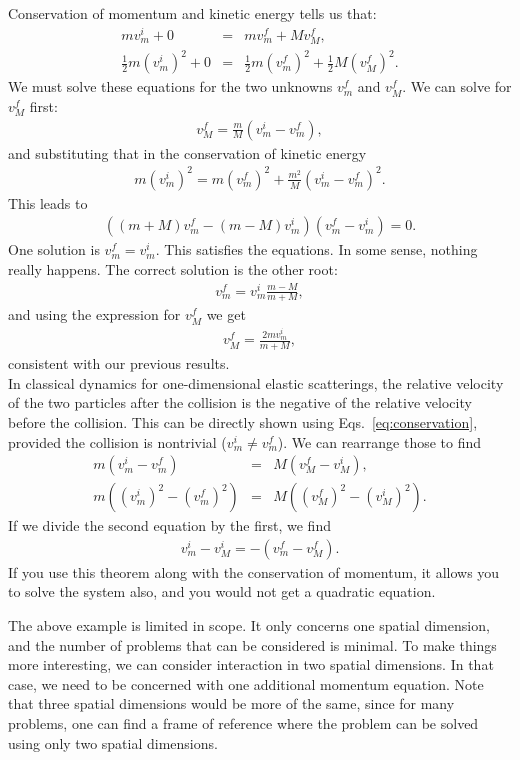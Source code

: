 \documentclass[12pt]{article}
\newcommand{\be}{\begin{eqnarray}}
\newcommand{\ee}{\end{eqnarray}}
\begin{document}
Conservation of momentum and kinetic energy tells us that:
\be
m v^i_m + 0  &=& mv_m^f + M v_M^f, \\
\frac{1}{2}m (v_m^i)^2 + 0 &=& \frac{1}{2} m (v_m^f)^2 + \frac{1}{2} M (v_M^f)^2. \label{eq:conservation}
\ee
We must solve these equations for the two unknowns $v_m^f$ and $v_M^f$. We can solve for $v_M^f$ first: 
\be
v_M^f = \frac{m}{M}(v_m^i - v_m^f),
\ee
and substituting that in the conservation of kinetic energy 
\be
m (v_m^i)^2 = m (v_m^f)^2 + \frac{m^2}{M}(v_m^i - v_m^f)^2. 
\ee
This leads to 
\be
\left( (m + M) v_m^f - (m-M)v_m^i\right)(v_m^f-v_m^i) = 0.
\ee
One solution is $v_m^f = v_m^i$. This satisfies the equations. In some sense, nothing really happens. The correct solution is the other root:
\be
v_m^f = v_m^i\frac{m-M}{m+M},
\ee
and using the expression for $v_M^f$ we get 
\be
v_M^f = \frac{2mv_m^i}{m + M},
\ee
consistent with our previous results. \\

In classical dynamics for one-dimensional elastic scatterings, the relative velocity of the two particles after the collision is the negative of the relative velocity before the collision. This can be directly shown using Eqs.~\eqref{eq:conservation}, provided the collision is nontrivial ($v_m^i\neq v_m^f$). We can rearrange those to find
\be
m(v_m^i -v_m^f) &=& M (v_M^f - v_M^i), \\
m((v_m^i)^2 - (v_m^f)^2) &=& M ((v_M^f)^2 -(v_M^i)^2).
\ee
If we divide the second equation by the first, we find 
\be
v_m^i - v_M^i = -(v_m^f - v_M^f).
\ee
If you use this theorem along with the conservation of momentum, it allows you to solve the system also, and you would not get a quadratic equation. 

The above example is limited in scope. It only concerns one spatial dimension, and the number of problems that can be considered is minimal. To make things more interesting, we can consider interaction in two spatial dimensions. In that case, we need to be concerned with one additional momentum equation. Note that three spatial dimensions would be more of the same, since for many problems, one can find a frame of reference where the problem can be solved using only two spatial dimensions. 
\end{document}
